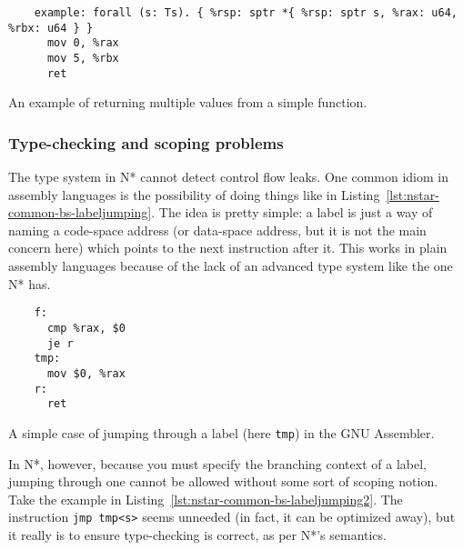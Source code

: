 \begin{listing}[htb]
  \centering
  \begin{minipage}{0.90\textwidth}
    \begin{verbatim}
    example: forall (s: Ts). { %rsp: sptr *{ %rsp: sptr s, %rax: u64, %rbx: u64 } }
      mov 0, %rax
      mov 5, %rbx
      ret
    \end{verbatim}
  \end{minipage}
  \caption{An example of returning multiple values from a simple function.}
  \label{lst:nstar-common-bs-returnvalues}
\end{listing}

\subsubsection{Type-checking and scoping problems}\label{subsubsec:nstar-common-bs-restrictions-tcscopes}

The type system in N* cannot detect control flow leaks.
One common idiom in assembly languages is the possibility of doing things like in Listing~\ref{lst:nstar-common-bs-labeljumping}.
The idea is pretty simple: a label is just a way of naming a code-space address (or data-space address, but it is not the main concern here) which points to the next instruction after it.
This works in plain assembly languages because of the lack of an advanced type system like the one N* has.

\begin{listing}[htb]
  \centering
  \begin{minipage}{0.90\textwidth}
    \begin{verbatim}
    f:
      cmp %rax, $0
      je r
    tmp:
      mov $0, %rax
    r:
      ret
    \end{verbatim}
  \end{minipage}
  \caption{A simple case of jumping through a label (here \texttt{tmp}) in the GNU Assembler.}
  \label{lst:nstar-common-bs-labeljumping}
\end{listing}

In N*, however, because you must specify the branching context of a label, jumping through one cannot be allowed without some sort of scoping notion.
Take the example in Listing~\ref{lst:nstar-common-bs-labeljumping2}.
The instruction \texttt{jmp tmp<s>} seems unneeded (in fact, it can be optimized away), but it really is to ensure type-checking is correct, as per N*'s semantics.


